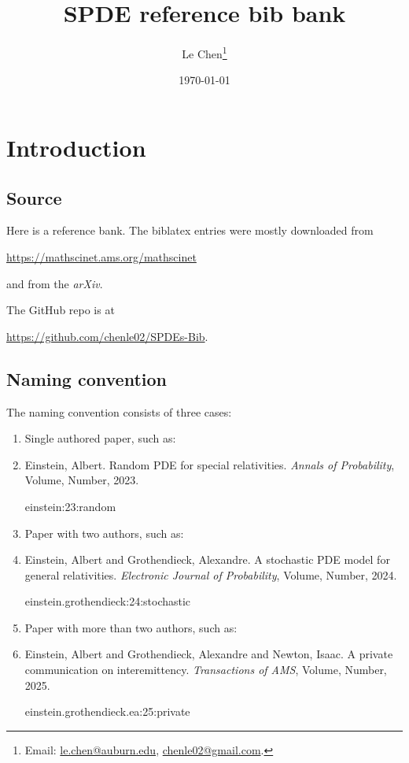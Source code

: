 \documentclass[a4paper,11pt]{article}
\title{SPDE reference bib bank}
\author{Le Chen\footnote{Email: \url{le.chen@auburn.edu}, \url{chenle02@gmail.com}.}}
\date{\today}
\begin{document}
\maketitle
\tableofcontents

\section{Introduction}

\subsection{Source}
Here is a reference bank. The biblatex entries were mostly downloaded from

\begin{center}
  \url{https://mathscinet.ams.org/mathscinet}
\end{center}

\noindent and from the \textit{arXiv}. \bigskip

The GitHub repo is at
\begin{center}
  \url{https://github.com/chenle02/SPDEs-Bib}.
\end{center}

\subsection{Naming convention}

The naming convention consists of three cases:
\begin{enumerate}
  \item Single authored paper, such as:
  \item[] Einstein, Albert. Random PDE for special relativities.
    \textit{Annals of Probability}, Volume, Number, 2023.
    \begin{center}
      einstein:23:random
    \end{center}
    \bigskip

  \item Paper with two authors, such as:
  \item[] Einstein, Albert and Grothendieck, Alexandre. A stochastic PDE
    model for general relativities. \textit{Electronic Journal of Probability},
    Volume, Number, 2024.
    \begin{center}
      einstein.grothendieck:24:stochastic
    \end{center}
    
  \item Paper with more than two authors, such as:
  \item[] Einstein, Albert and Grothendieck, Alexandre and Newton, Isaac.
    A private communication on interemittency. \textit{Transactions of AMS},
    Volume, Number, 2025.
    \begin{center}
      einstein.grothendieck.ea:25:private
    \end{center}
\end{enumerate}
\bigskip
\end{document}
